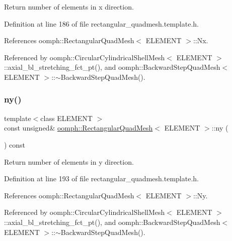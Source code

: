 Return number of elements in x direction. 



Definition at line 186 of file rectangular\+\_\+quadmesh.\+template.\+h.



References oomph\+::\+Rectangular\+Quad\+Mesh$<$ E\+L\+E\+M\+E\+N\+T $>$\+::\+Nx.



Referenced by oomph\+::\+Circular\+Cylindrical\+Shell\+Mesh$<$ E\+L\+E\+M\+E\+N\+T $>$\+::axial\+\_\+bl\+\_\+stretching\+\_\+fct\+\_\+pt(), and oomph\+::\+Backward\+Step\+Quad\+Mesh$<$ E\+L\+E\+M\+E\+N\+T $>$\+::$\sim$\+Backward\+Step\+Quad\+Mesh().

\mbox{\label{classoomph_1_1RectangularQuadMesh_a86d76a55eb7c4e8bca9b74d23c8b0412}} 
\subsubsection{\texorpdfstring{ny()}{ny()}}
{\footnotesize\ttfamily template$<$class E\+L\+E\+M\+E\+NT $>$ \\
const unsigned\& \hyperlink{classoomph_1_1RectangularQuadMesh}{oomph\+::\+Rectangular\+Quad\+Mesh}$<$ E\+L\+E\+M\+E\+NT $>$\+::ny (\begin{DoxyParamCaption}{ }\end{DoxyParamCaption}) const\hspace{0.3cm}{\ttfamily [inline]}}



Return number of elements in y direction. 



Definition at line 193 of file rectangular\+\_\+quadmesh.\+template.\+h.



References oomph\+::\+Rectangular\+Quad\+Mesh$<$ E\+L\+E\+M\+E\+N\+T $>$\+::\+Ny.



Referenced by oomph\+::\+Circular\+Cylindrical\+Shell\+Mesh$<$ E\+L\+E\+M\+E\+N\+T $>$\+::axial\+\_\+bl\+\_\+stretching\+\_\+fct\+\_\+pt(), and oomph\+::\+Backward\+Step\+Quad\+Mesh$<$ E\+L\+E\+M\+E\+N\+T $>$\+::$\sim$\+Backward\+Step\+Quad\+Mesh().

\mbox{\label{classoomph_1_1RectangularQuadMesh_a3449b36a5e4fc4728e517bd38d7b0cc6}} 
